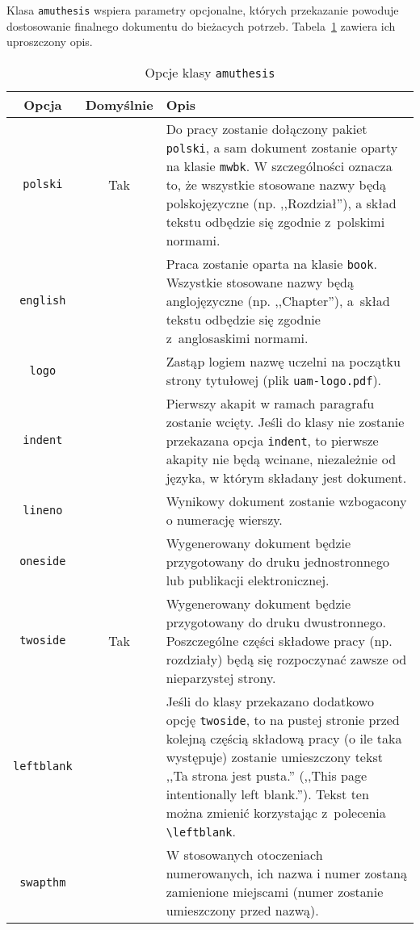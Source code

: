 \documentclass[oneside]{amuthesis}
\begin{document}
Klasa \texttt{amuthesis} wspiera parametry opcjonalne, których przekazanie powoduje dostosowanie finalnego dokumentu do bieżacych potrzeb. Tabela~\ref{table:amuthesis-opcje} zawiera ich uproszczony opis.

\begin{table}[p]
  \caption{Opcje klasy \texttt{amuthesis}}
  \label{table:amuthesis-opcje}
  \centering
  \begin{tabular}{ccp{9cm}}
    \toprule
    Opcja & Domyślnie & Opis\\
    \midrule
    \texttt{polski} & Tak & Do pracy zostanie dołączony pakiet \texttt{polski}, a sam dokument zostanie oparty na klasie \texttt{mwbk}. W szczególności oznacza to, że wszystkie stosowane nazwy będą polskojęzyczne (np. ,,Rozdział''), a skład tekstu odbędzie się zgodnie z~polskimi normami.\\
    \midrule
    \texttt{english} & & Praca zostanie oparta na klasie \texttt{book}. Wszystkie stosowane nazwy będą anglojęzyczne (np. ,,Chapter''), a~skład tekstu odbędzie się zgodnie z~anglosaskimi normami.\\
    \midrule
    \texttt{logo} & & Zastąp logiem nazwę uczelni na początku strony tytułowej (plik \texttt{uam-logo.pdf}).\\
    \midrule
    \texttt{indent} & & Pierwszy akapit w ramach paragrafu zostanie wcięty. Jeśli do klasy nie zostanie przekazana opcja \texttt{indent}, to pierwsze akapity nie będą wcinane, niezależnie od języka, w którym składany jest dokument.\\
    \midrule
    \texttt{lineno} & & Wynikowy dokument zostanie wzbogacony o numerację wierszy.\\
    \midrule
    \texttt{oneside} & & Wygenerowany dokument będzie przygotowany do druku jednostronnego lub publikacji elektronicznej.\\
    \midrule
    \texttt{twoside} & Tak & Wygenerowany dokument będzie przygotowany do druku dwustronnego. Poszczególne części składowe pracy (np. rozdziały) będą się rozpoczynać zawsze od nieparzystej strony.\\
    \midrule
    \texttt{leftblank} & & Jeśli do klasy przekazano dodatkowo opcję \texttt{twoside}, to na pustej stronie przed kolejną częścią składową pracy (o ile taka występuje) zostanie umieszczony tekst ,,Ta strona jest pusta.'' (,,This page intentionally left blank.''). Tekst ten można zmienić korzystając z~polecenia \verb`\leftblank`.\\
    \midrule
    \texttt{swapthm} & & W stosowanych otoczeniach numerowanych, ich nazwa i numer zostaną zamienione miejscami (numer zostanie umieszczony przed nazwą).\\
    \bottomrule
  \end{tabular}
\end{table}
\end{document}
